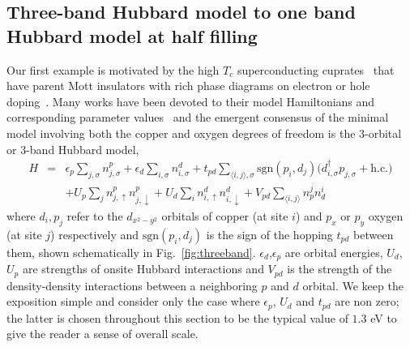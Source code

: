 \subsection{Three-band Hubbard model to one band Hubbard model at half filling}
\label{subsection:3band} 
Our first example is motivated by the high $T_c$ superconducting cuprates~\cite{Bednorz1986} that 
have parent Mott insulators with rich phase diagrams on electron or hole doping~\cite{Dagotto_RevModPhys, LeeWen_RevModPhys}. 
Many works have been devoted to their model Hamiltonians and corresponding parameter 
values~\cite{Emery, ZhangRice, tJSpalek, Hybertsen_PRB1989, Hybertsen_PRB1990, Pavirini, Kent_Hubbard} and the 
emergent consensus of the minimal model involving both the copper and oxygen degrees of freedom 
is the 3-orbital or 3-band Hubbard model, 
\begin{eqnarray}
H &=&    \epsilon_p \sum_{j,\sigma} n^{p}_{j,\sigma} + \epsilon_{d} \sum_{i,\sigma}  n^{d}_{i,\sigma} 
	+ t_{pd} \sum_{\langle i,j \rangle, \sigma} \text{sgn}(p_i,d_j) \Big( d_{i,\sigma}^{\dagger} p_{j,\sigma} + \text{h.c.} \Big) \nonumber \\
  & &   + U_p \sum_{j} n^{p}_{j,\uparrow} n^{p}_{j,\downarrow} + U_d \sum_{i} n^{d}_{i,\uparrow} n^{d}_{i,\downarrow} + V_{pd} \sum_{\langle i,j \rangle} n^{j}_p n^{i}_d 
\end{eqnarray}
where $d_i,p_j$ refer to the  $d_{x^2 - y^2}$ orbitals of copper (at site $i$) and $p_x$ or $p_y$ 
oxygen (at site $j$)  respectively and $\text{sgn}(p_i,d_j)$ is the sign of the hopping $t_{pd}$ 
between them, shown schematically in Fig.~\ref{fig:threeband}. 
$\epsilon_d$,$\epsilon_p$ are orbital energies, $U_d$, $U_p$ are strengths of onsite Hubbard interactions 
and $V_{pd}$ is the strength of the density-density interactions between a neighboring $p$ and $d$ orbital. 
We keep the exposition simple and consider only the case where $\epsilon_p$, $U_d$ and $t_{pd}$ 
are non zero; the latter is chosen throughout this section to be the typical value of $1.3$ eV to give the reader a sense of overall scale. 
